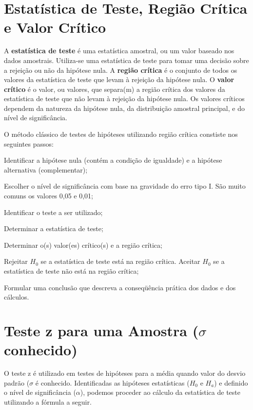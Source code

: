 \section{Estatística de Teste, Região Crítica e Valor Crítico}

A \textbf{estatística de teste} é uma estatística amostral, ou um valor baseado nos dados
amostrais. Utiliza-se uma estatística de teste para tomar uma decisão sobre a rejeição ou não da hipótese nula. A \textbf{região crítica} é o conjunto de todos os valores da estatística de teste que levam à rejeição da hipótese nula. O \textbf{valor crítico} é o valor, ou valores, que separa(m) a região crítica dos valores da estatística de teste que não levam à rejeição da hipótese nula. Os valores críticos dependem da natureza da hipótese nula, da distribuição amostral principal, e do nível de significância.

O método clássico de testes de hipóteses  utilizando região crítica constiste nos seguintes passos:
\begin{alineas}
\item Identificar a hipótese nula (contém a condição de igualdade) e a hipótese alternativa (complementar);
\item Escolher o nível de significância com base na gravidade do erro tipo I. São
muito comuns os valores 0,05 e 0,01;
\item Identificar o teste a ser utilizado;
\item Determinar a estatística de teste;
\item Determinar o(s) valor(es) crítico(s) e a região crítica;
\item Rejeitar \(H_0\) se a estatística de teste está na região crítica. Aceitar \(H_0\) se a estatística de teste não está na região crítica;
\item Formular uma conclusão que descreva a conseqüência prática dos dados e dos cálculos.
\end{alineas}

\section{Teste z para uma Amostra (\(\sigma\) conhecido)}

O teste z é utilizado em testes de hipóteses para a média quando valor do desvio padrão (\(\sigma\) é conhecido. Identificadas as hipóteses estatísticas (\(H_0\) e \(H_a\)) e definido o nível de significância (\(\alpha\)), podemos proceder ao cálculo da estatística de teste utilizando a fórmula a seguir.

